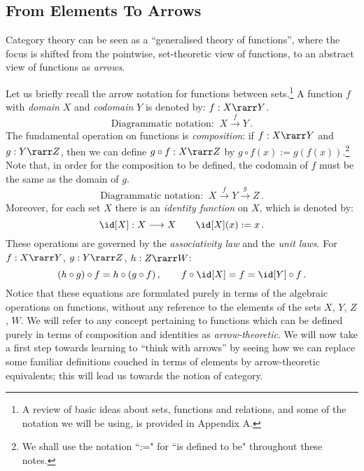 \documentclass{svmult}
\begin{document}
\subsection{From Elements To Arrows}
%
Category theory can be seen as a ``generalised theory of functions'',  where the focus is shifted from the pointwise, set-theoretic view of functions,
to an abstract view of functions as \emph{arrows}.

Let us briefly recall the arrow notation for functions between sets.\footnote{A review of basic ideas about sets, functions and relations, and some of the notation we will be using, is provided in Appendix A.} A
function $f$ with \emph{domain} $X$ and \emph{codomain} $Y$ is denoted by: $f : X \rarr Y$.
\[ \mbox{Diagrammatic notation:} \;\;  X \stackrel{f}{\longrightarrow} Y\,.\]
The fundamental operation on functions is \emph{composition}: if $f : X \rarr Y$ and $g : Y \rarr Z$, then we can define $g \circ f: X \rarr Z$ by $g \circ f(x) := g(f(x))$.\footnote{We shall use the notation ``:=" for ``is defined to be" throughout these notes.} Note that, in order for the composition to be defined, the codomain of $f$ must be the same as the domain of $g$.
\[  \mbox{Diagrammatic notation:}\;\; X \stackrel{f}{\longrightarrow} Y \stackrel{g}{\longrightarrow} Z\,. \]
Moreover, for each set $X$ there is an \emph{identity function} on $X$, which is denoted by:
\[ \id[X] : X \longrightarrow X\qquad \id[X](x) := x \,. \]
These operations are  governed by the \emph{associativity law} and the \emph{unit laws}. For $f : X \rarr Y$, $g: Y \rarr Z$, $h : Z \rarr W$:
\[ (h \circ g) \circ f = h \circ (g \circ f)\,, \qquad f\circ\id[X] = f = \id[Y]\circ f\,. \]
Notice that these equations are formulated purely in terms of the algebraic operations on functions, without any reference to the elements of the sets $X$, $Y$, $Z$, $W$.
We will refer to any concept pertaining to functions which can be defined purely in terms of composition and identities  as \emph{arrow-theoretic}.
We will now take a first step towards learning to ``think with arrows'' by seeing how we can replace some familiar definitions couched in terms of elements by arrow-theoretic equivalents; this will lead us towards the notion of category.
\end{document}
